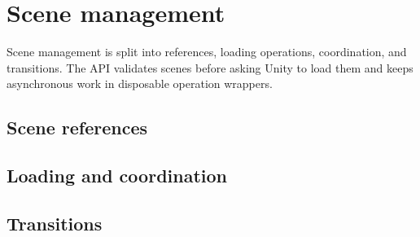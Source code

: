 \section{Scene management}
\label{sec:scene-management}

Scene management is split into references, loading operations, coordination, and transitions. The API validates scenes before asking Unity to load them and keeps asynchronous work in disposable operation wrappers.

\subsection{Scene references}


\subsection{Loading and coordination}


\subsection{Transitions}

